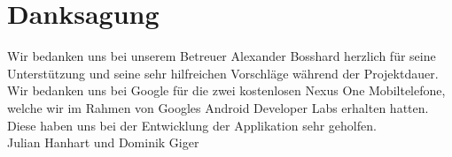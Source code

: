 \chapter*{Danksagung}
\thispagestyle{empty}
Wir bedanken uns bei unserem Betreuer Alexander Bosshard herzlich für seine Unterstützung und seine sehr hilfreichen Vorschläge während der Projektdauer.\\

Wir bedanken uns bei Google für die zwei kostenlosen Nexus One Mobiltelefone, welche wir im Rahmen von Googles Android Developer Labs erhalten hatten. Diese haben uns bei der Entwicklung der Applikation sehr geholfen. \\

Julian Hanhart und Dominik Giger


